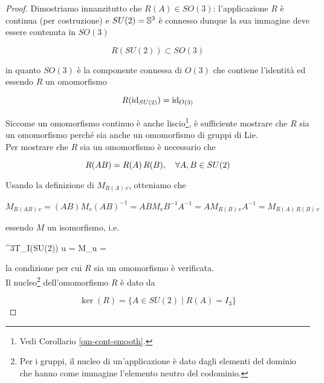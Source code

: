 \begin{proof}
	Dimostriamo innanzitutto che $ R(A) \in SO(3) $: l'applicazione $ R $ è continua (per costruzione) e $ SU(2) = \S^{3} $ è connesso dunque la sua immagine deve essere contenuta in $ SO(3) $
	
	\begin{equation}
		R(SU(2)) \subset SO(3)
	\end{equation}
	
	in quanto $ SO(3) $ è la componente connessa di $ O(3) $ che contiene l'identità ed essendo $ R $ un omomorfismo
	
	\begin{equation}
		R(\id_{SU(2)}) = \id_{O(3)}
	\end{equation}

	Siccome un omomorfismo continuo è anche liscio\footnote{%
		Vedi Corollario \ref{om-cont-smooth}.%
	}, è sufficiente mostrare che $ R $ sia un omomorfismo perché sia anche un omomorfismo di gruppi di Lie.\\
	Per mostrare che $ R $ sia un omomorfismo è necessario che
	
	\begin{equation}
		R(A B) = R(A) \, R(B) \qcomma \forall A,B \in SU(2)
	\end{equation}

	Usando la definizione di $ M_{R(A) \, v} $, otteniamo che
	
	\begin{equation}
		M_{R(A B) \, v} = (A B) M_{v} (A B)^{-1} %
		= A B M_{v} B^{-1} A^{-1} %
		= A M_{R(B) \, v} A^{-1} %
		= M_{R(A) \, R(B) \, v}
	\end{equation}

	essendo $ M $ un isomorfismo, i.e.
	
		{\R^{3}}{T_{I}(SU(2))}
		{u = }
		{M_{u} = }
	
	la condizione per cui $ R $ sia un omomorfismo è verificata.\\
	Il nucleo\footnote{%
		Per i gruppi, il nucleo di un'applicazione è dato dagli elementi del dominio che hanno come immagine l'elemento neutro del codominio.%
	} dell'omomorfismo $ R $ è dato da
	
	\begin{equation}
		\ker(R) = \{ A \in SU(2) \mid R(A) = I_{3} \}
	\end{equation}


\end{proof}
